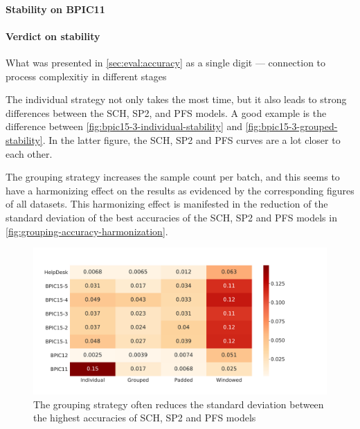 \paragraph{Stability on BPIC11}

\paragraph{Verdict on stability}
What was presented in \autoref{sec:eval:accuracy} as a single digit --- connection to process complexitiy in different stages


The individual strategy not only takes the most time, but it also leads to strong differences between the SCH, SP2, and PFS models. A good example is the difference between \autoref{fig:bpic15-3-individual-stability} and \autoref{fig:bpic15-3-grouped-stability}. In the latter figure, the SCH, SP2 and PFS curves are a lot closer to each other.

The grouping strategy increases the sample count per batch, and this seems to have a harmonizing effect on the results as evidenced by the corresponding figures of all datasets. This harmonizing effect is manifested in the reduction of the standard deviation of the best accuracies of the SCH, SP2 and PFS models in \autoref{fig:grouping-accuracy-harmonization}.

\begin{figure}
    \centering
    \includegraphics[width=\textwidth]{gfx/grouping-accuracy-harmonization.pdf}
    \caption[Batching strategy harmonizes top accuracies]{The grouping strategy often reduces the standard deviation between the highest accuracies of SCH, SP2 and PFS models}
    \label{fig:grouping-accuracy-harmonization}
\end{figure}

